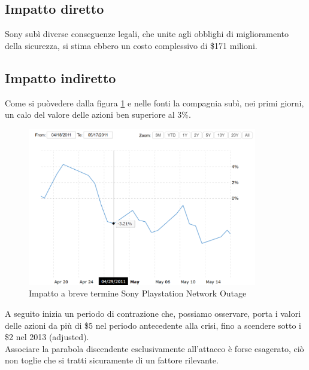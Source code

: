 \documentclass[12pt,a4paper,openright,twoside]{report}
\begin{document}
\subsection{Impatto diretto}
Sony sub\`i diverse conseguenze legali, che unite agli obblighi di miglioramento della sicurezza, si stima ebbero un costo complessivo di \$171 milioni.\\
\subsection{Impatto indiretto}
Come si pu\`ovedere dalla figura \ref{fig:pnt1} e nelle fonti \cite{Sony_pnt} la compagnia sub\`i, nei primi giorni, un calo del valore delle azioni ben superiore al 3\%.\\

\begin{figure}[H] 
\begin{center} 
\includegraphics[width=10cm]{figures/sony_2011_shortTerm.png} 
\caption[Grafico Sony PSN short]{Impatto a breve termine Sony Playstation Network Outage}\label{fig:pnt1}
\end{center}
\end{figure}

A seguito inizia un periodo di contrazione che, possiamo osservare, porta i valori delle azioni da pi\`u di \$5 nel periodo antecedente alla crisi, fino a scendere sotto i \$2 nel 2013 (adjusted). \\Associare la parabola discendente esclusivamente all'attacco \`e forse esagerato, ci\`o non toglie che si tratti sicuramente di un fattore rilevante.\\ 
\end{document}
